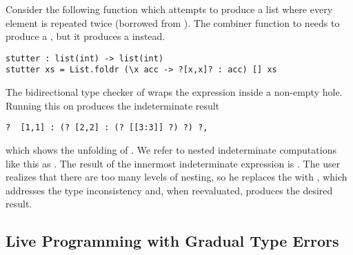 
%
Consider the following function which attempts to produce a
list where every element is repeated twice (borrowed from \citet{Osera2015}).
%
The combiner function to  needs to produce a , but
it produces a  instead.

\begin{lstlisting}
stutter : list(int) -> list(int)
stutter xs = List.foldr (\x acc -> ?[x,x]? : acc) [] xs
\end{lstlisting}

\noindent
%
The bidirectional type checker of \citet{popl-paper} wraps the expression
\li{[x,x]} inside a non-empty hole.
%
%
Running this on  produces the indeterminate result

\begin{lstlisting}
?  [1,1] : (? [2,2] : (? [[3:3]] ?) ?) ?,
\end{lstlisting}

\noindent
%
which shows the unfolding of .
%
We refer to nested indeterminate computations like this as .
%
The result of the innermost indeterminate expression is \li{[[3,3]]}.
%
The user realizes that there are too many levels of nesting, so
he replaces the \li{(:)} with , which addresses the type inconsistency
and, when reevaluated, produces the desired result.


\subsection{Live Programming with Gradual Type Errors}

